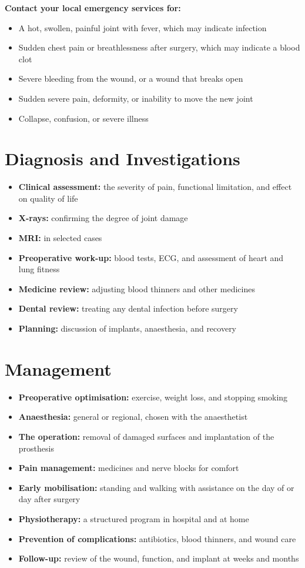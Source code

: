 \textbf{Contact your local emergency services for:}
\begin{itemize}
    \item A hot, swollen, painful joint with fever, which may indicate infection
    \item Sudden chest pain or breathlessness after surgery, which may indicate a blood clot
    \item Severe bleeding from the wound, or a wound that breaks open
    \item Sudden severe pain, deformity, or inability to move the new joint
    \item Collapse, confusion, or severe illness
\end{itemize}

\section*{Diagnosis and Investigations}
\begin{itemize}
    \item \textbf{Clinical assessment:} the severity of pain, functional limitation, and effect on quality of life
    \item \textbf{X-rays:} confirming the degree of joint damage
    \item \textbf{MRI:} in selected cases
    \item \textbf{Preoperative work-up:} blood tests, ECG, and assessment of heart and lung fitness
    \item \textbf{Medicine review:} adjusting blood thinners and other medicines
    \item \textbf{Dental review:} treating any dental infection before surgery
    \item \textbf{Planning:} discussion of implants, anaesthesia, and recovery
\end{itemize}

\section*{Management}
\begin{itemize}
    \item \textbf{Preoperative optimisation:} exercise, weight loss, and stopping smoking
    \item \textbf{Anaesthesia:} general or regional, chosen with the anaesthetist
    \item \textbf{The operation:} removal of damaged surfaces and implantation of the prosthesis
    \item \textbf{Pain management:} medicines and nerve blocks for comfort
    \item \textbf{Early mobilisation:} standing and walking with assistance on the day of or day after surgery
    \item \textbf{Physiotherapy:} a structured program in hospital and at home
    \item \textbf{Prevention of complications:} antibiotics, blood thinners, and wound care
    \item \textbf{Follow-up:} review of the wound, function, and implant at weeks and months
\end{itemize}

